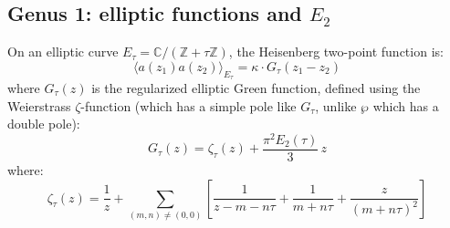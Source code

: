\subsection{\texorpdfstring{Genus 1: elliptic functions and $E_2$}{Genus 1: elliptic functions and E 2}}
\label{subsec:heisenberg-genus-one-complete}

\begin{theorem}\label{thm:heisenberg-genus-one-complete}
On an elliptic curve $E_\tau = \mathbb{C}/(\mathbb{Z} + \tau\mathbb{Z})$, the 
Heisenberg two-point function is:
\begin{equation}
\langle a(z_1) a(z_2) \rangle_{E_\tau} = \kappa \cdot G_\tau(z_1 - z_2)
\end{equation}
where $G_\tau(z)$ is the regularized elliptic Green function, defined using the Weierstrass $\zeta$-function (which has a simple pole like $G_\tau$, unlike $\wp$ which has a double pole):
\begin{equation}
G_\tau(z) = \zeta_\tau(z) + \frac{\pi^2 E_2(\tau)}{3}\, z
\end{equation}
where:
\begin{equation}
\zeta_\tau(z) = \frac{1}{z} + \sum_{(m,n) \neq (0,0)} \left[
\frac{1}{z - m - n\tau} + \frac{1}{m+n\tau} + \frac{z}{(m+n\tau)^2}
\right]
\end{equation}
\end{theorem}

